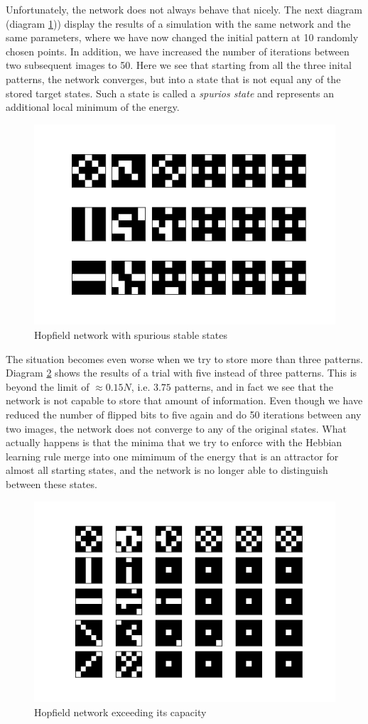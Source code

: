 \documentclass[a4paper, draft]{article}
\theoremstyle{own}
\theoremstyle{remark}
\begin{document}
Unfortunately, the network does not always behave that nicely. The next diagram (diagram \ref{fig:HopfieldTwo})) display the results of a simulation with the same network and the same parameters, where we have now changed the initial pattern at 10 randomly chosen points. In addition, we have increased the number of iterations between two subsequent images to 50. Here we see that starting from all the three inital patterns, the network converges, but into a state that is not equal any of the stored target states. Such a state is called a {\em spurios state} and represents an additional local minimum of the energy.

\begin{figure}[ht]
	\centering
	\includegraphics[width=0.7\linewidth]{HopfieldTwo}
	\caption{Hopfield network with spurious stable states}
	\label{fig:HopfieldTwo}
\end{figure}

The situation becomes even worse when we try to store more than three patterns. Diagram \ref{fig:HopfieldThree} shows the results of a trial with five instead of three patterns. This is beyond the limit of $\approx 0.15 N$, i.e. $3.75$ patterns, and in fact we see that the network is not capable to store that amount of information. Even though we have reduced the number of flipped bits to five again and do 50 iterations between any two images, the network does not converge to any of the original states. What actually happens is that the minima that we try to enforce with the Hebbian learning rule merge into one mimimum of the energy that is an attractor for almost all starting states, and the network is no longer able to distinguish between these states.

\begin{figure}[ht]
	\centering
	\includegraphics[width=0.7\linewidth]{HopfieldThree}
	\caption{Hopfield network exceeding its capacity}
	\label{fig:HopfieldThree}
\end{figure}
\end{document}
